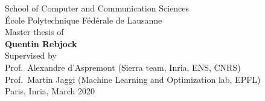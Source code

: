 \begin{titlepage}
\begin{center}
School of Computer and Communication Sciences\\
École Polytechnique Fédérale de Lausanne\\
Master thesis of\\[4pt]
\textbf{Quentin Rebjock}\\[9pt]
\small
Supervised by\\[4pt]
%
Prof.\ Alexandre d'Aspremont (Sierra team, Inria, ENS, CNRS)\\
Prof.\ Martin Jaggi (Machine Learning and Optimization lab, EPFL)\\[12pt]
%
Paris, Inria, March 2020

\end{center}
\end{titlepage}

\restoregeometry
